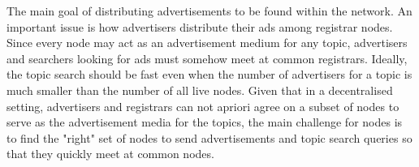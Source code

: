 The main goal of distributing advertisements to be found within the network. An important issue is how advertisers distribute their ads among registrar nodes. 
Since every node may act as an advertisement medium for any topic,  advertisers and searchers looking for ads must somehow meet at common registrars. 
Ideally, the topic search should be fast even when the number of advertisers for a topic is much smaller than the number of all live nodes. Given that in a decentralised setting, advertisers and registrars can not apriori agree on a subset of nodes to serve as the advertisement media for the topics, the main challenge for nodes is to find the "right" set of nodes to send advertisements and topic search queries so that they quickly meet at common nodes.